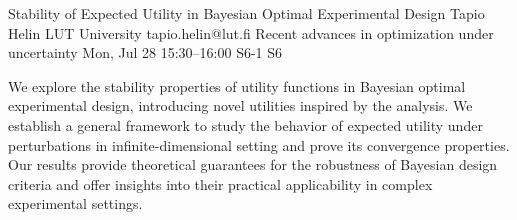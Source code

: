 \begin{talk}
  {Stability of Expected Utility in Bayesian Optimal Experimental Design}%
  {Tapio Helin}%
  {LUT University}%
  {tapio.helin@lut.fi}%
  {Recent advances in optimization under uncertainty}%
  {}%
  {Mon, Jul 28 15:30--16:00}%
  {S6-1}%
  {S6}%
    
   
We explore the stability properties of utility functions in Bayesian optimal experimental design, introducing novel utilities inspired by the analysis. We establish a general framework to study the behavior of expected utility under perturbations in infinite-dimensional setting and prove its convergence properties. Our results provide theoretical guarantees for the robustness of Bayesian design criteria and offer insights into their practical applicability in complex experimental settings.

\medskip

%
\end{talk}

